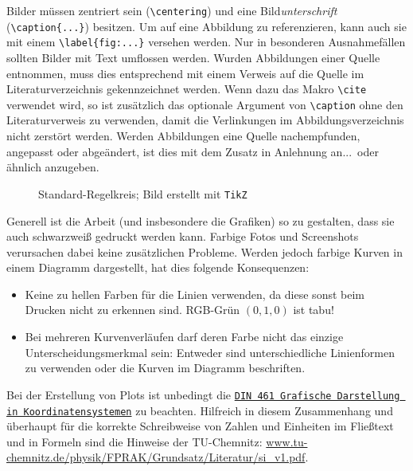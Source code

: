 Bilder müssen zentriert sein (\verb|\centering|) und eine Bild\emph{unterschrift} (\verb|\caption{...}|) besitzen.
Um auf eine Abbildung zu referenzieren, kann auch sie mit einem \verb|\label{fig:...}| versehen werden.
Nur in besonderen Ausnahmefällen sollten Bilder mit Text umflossen werden.
Wurden Abbildungen einer Quelle entnommen, muss dies entsprechend mit einem Verweis auf die Quelle im Literaturverzeichnis gekennzeichnet werden.
Wenn dazu das Makro \verb|\cite| verwendet wird, so ist zusätzlich das optionale Argument von \verb|\caption| ohne den Literaturverweis zu verwenden, damit die Verlinkungen im Abbildungsverzeichnis nicht zerstört werden.
Werden Abbildungen eine Quelle nachempfunden, angepasst oder abgeändert, ist dies mit dem Zusatz \glqq in Anlehnung an...\grqq\ oder ähnlich anzugeben.

\begin{figure}[htp]
	\centering
	
	\caption{Standard-Regelkreis; Bild erstellt mit \texttt{TikZ}}
	\label{fig:Standardregelkreis}
\end{figure}

Generell ist die Arbeit (und insbesondere die Grafiken) so zu gestalten, dass sie auch schwarzweiß gedruckt werden kann.
Farbige Fotos und Screenshots verursachen dabei \iA keine zusätzlichen Probleme.
Werden jedoch \zB farbige Kurven in einem Diagramm dargestellt, hat dies folgende Konsequenzen:
\begin{itemize}
	\item Keine zu hellen Farben für die Linien verwenden, da diese sonst beim Drucken nicht zu erkennen sind.
	RGB-Grün $(0,1,0)$ ist tabu!
	\item Bei mehreren Kurvenverläufen darf deren Farbe nicht das einzige Unterscheidungsmerkmal sein: Entweder sind unterschiedliche Linienformen zu verwenden oder die Kurven im Diagramm beschriften.
\end{itemize}

Bei der Erstellung von Plots ist unbedingt die \href{http://de.wikipedia.org/wiki/DIN_461}{\texttt{DIN 461 Grafische Darstellung in Koordinatensystemen}} zu beachten.
Hilfreich in diesem Zusammenhang und überhaupt für die korrekte Schreibweise von Zahlen und Einheiten im Fließtext und in Formeln sind die Hinweise der TU-Chemnitz: \url{www.tu-chemnitz.de/physik/FPRAK/Grundsatz/Literatur/si_v1.pdf}.

